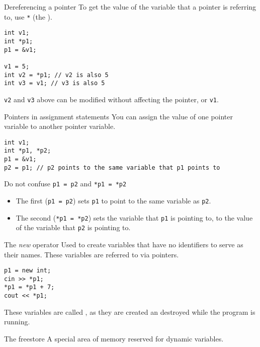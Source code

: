\documentclass[\main/notes.tex]{subfiles}
\begin{document}
				\begin{definition}{Dereferencing a pointer}
					To get the value of the variable that a pointer is referring to, use \texttt{*} (the ).
					\begin{verbatim}
int v1;
int *p1;
p1 = &v1;

v1 = 5;
int v2 = *p1; // v2 is also 5
int v3 = v1; // v3 is also 5
					\end{verbatim}
					\texttt{v2} and \texttt{v3} above can be modified without affecting the pointer, or \texttt{v1}.
				\end{definition}
				\begin{definition}{Pointers in assignment statements}
					You can assign the value of one pointer variable to another pointer variable.
					\begin{verbatim}
int v1;
int *p1, *p2;
p1 = &v1;
p2 = p1; // p2 points to the same variable that p1 points to
					\end{verbatim}
				\end{definition}
				\begin{sidenote}{Do not confuse \texttt{p1 = p2} and \texttt{*p1 = *p2}}
					\begin{itemize}
						\item The first (\texttt{p1 = p2}) sets \texttt{p1} to point to the same variable as \texttt{p2}.
						\item The second (\texttt{*p1 = *p2}) sets the variable that \texttt{p1} is pointing to, to the value of the variable that \texttt{p2} is pointing to.
					\end{itemize}
				\end{sidenote}
				\begin{definition}{The \emph{new} operator}
					Used to create variables that have no identifiers to serve as their names. These variables are referred to via pointers.
					\begin{verbatim}
p1 = new int;
cin >> *p1;
*p1 = *p1 + 7;
cout << *p1;
					\end{verbatim}
					These variables are called , as they are created an destroyed while the program is running.
				\end{definition}
				\begin{definition}{The freestore}
					A special area of memory reserved for dynamic variables.
				\end{definition}
\end{document}
